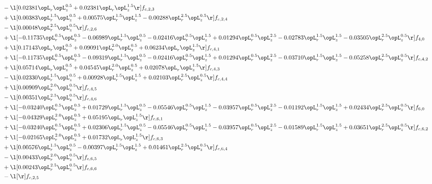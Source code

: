 \begin{alignat}{2}
& - \l[  0.02381 \opL_r \opL_z^{0.5} +  0.02381 \opL_r \opL_z^{1.5}  \r] f_{c,2,3} \nonumber \\ 
& + \l[  0.00383 \opL_r^{1.5} \opL_z^{0.5} +  0.00575 \opL_r^{1.5} \opL_z^{1.5}   -0.00288 \opL_r^{2.5} \opL_z^{0.5}  \r] f_{c,2,4} \nonumber \\ 
& - \l[  0.00048 \opL_r^{2.5} \opL_z^{0.5}  \r] f_{c,2,6} \nonumber \\ 
& + \l[  -0.11735 \opL_r^{0.5} \opL_z^{0.5}   -0.06989 \opL_r^{1.5} \opL_z^{0.5}   -0.02416 \opL_r^{0.5} \opL_z^{1.5} +  0.01294 \opL_r^{0.5} \opL_z^{2.5}   -0.02783 \opL_r^{1.5} \opL_z^{1.5}   -0.03505 \opL_r^{2.5} \opL_z^{0.5}  \r] f_{4,0} \nonumber \\ 
& + \l[  0.17143 \opL_r \opL_z^{0.5} +  0.09091 \opL_r^{2.0} \opL_z^{0.5} +  0.06234 \opL_r \opL_z^{1.5}  \r] f_{c,4,1} \nonumber \\ 
& + \l[  -0.11735 \opL_r^{0.5} \opL_z^{0.5}   -0.09319 \opL_r^{1.5} \opL_z^{0.5}   -0.02416 \opL_r^{0.5} \opL_z^{1.5} +  0.01294 \opL_r^{0.5} \opL_z^{2.5}   -0.03710 \opL_r^{1.5} \opL_z^{1.5}   -0.05258 \opL_r^{2.5} \opL_z^{0.5}  \r] f_{c,4,2} \nonumber \\ 
& + \l[  0.05714 \opL_r \opL_z^{0.5} +  0.04545 \opL_r^{2.0} \opL_z^{0.5} +  0.02078 \opL_r \opL_z^{1.5}  \r] f_{c,4,3} \nonumber \\ 
& - \l[  0.02330 \opL_r^{1.5} \opL_z^{0.5} +  0.00928 \opL_r^{1.5} \opL_z^{1.5} +  0.02103 \opL_r^{2.5} \opL_z^{0.5}  \r] f_{c,4,4} \nonumber \\ 
& + \l[  0.00909 \opL_r^{2.0} \opL_z^{0.5}  \r] f_{c,4,5} \nonumber \\ 
& - \l[  0.00351 \opL_r^{2.5} \opL_z^{0.5}  \r] f_{c,4,6} \nonumber \\ 
& + \l[  -0.03240 \opL_r^{0.5} \opL_z^{0.5} +  0.01729 \opL_r^{1.5} \opL_z^{0.5}   -0.05546 \opL_r^{0.5} \opL_z^{1.5}   -0.03957 \opL_r^{0.5} \opL_z^{2.5}   -0.01192 \opL_r^{1.5} \opL_z^{1.5} +  0.02434 \opL_r^{2.5} \opL_z^{0.5}  \r] f_{6,0} \nonumber \\ 
& + \l[  -0.04329 \opL_r^{2.0} \opL_z^{0.5} +  0.05195 \opL_r \opL_z^{1.5}  \r] f_{c,6,1} \nonumber \\ 
& + \l[  -0.03240 \opL_r^{0.5} \opL_z^{0.5} +  0.02306 \opL_r^{1.5} \opL_z^{0.5}   -0.05546 \opL_r^{0.5} \opL_z^{1.5}   -0.03957 \opL_r^{0.5} \opL_z^{2.5}   -0.01589 \opL_r^{1.5} \opL_z^{1.5} +  0.03651 \opL_r^{2.5} \opL_z^{0.5}  \r] f_{c,6,2} \nonumber \\ 
& + \l[  -0.02165 \opL_r^{2.0} \opL_z^{0.5} +  0.01732 \opL_r \opL_z^{1.5}  \r] f_{c,6,3} \nonumber \\ 
& + \l[  0.00576 \opL_r^{1.5} \opL_z^{0.5}   -0.00397 \opL_r^{1.5} \opL_z^{1.5} +  0.01461 \opL_r^{2.5} \opL_z^{0.5}  \r] f_{c,6,4} \nonumber \\ 
& - \l[  0.00433 \opL_r^{2.0} \opL_z^{0.5}  \r] f_{c,6,5} \nonumber \\ 
& + \l[  0.00243 \opL_r^{2.5} \opL_z^{0.5}  \r] f_{c,6,6} \nonumber \\ 
& - \l[  \r] f_{c,2,5} \nonumber \\ 
\end{alignat} 


